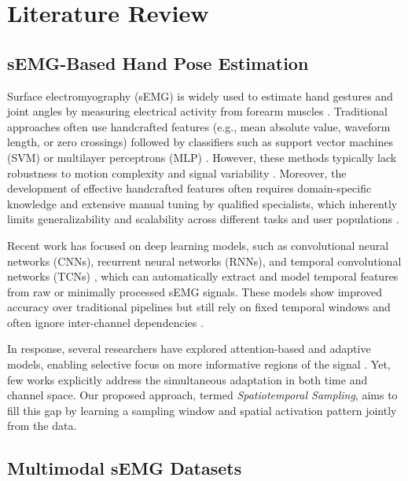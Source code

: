 \chapter{Literature Review}
\label{chap:lr}

\section{sEMG-Based Hand Pose Estimation}

Surface electromyography (sEMG) is widely used to estimate hand gestures and joint angles by measuring electrical activity from forearm muscles \cite{oskoei2007myoelectric, simao2019review}. Traditional approaches often use handcrafted features (e.g., mean absolute value, waveform length, or zero crossings) followed by classifiers such as support vector machines (SVM) or multilayer perceptrons (MLP) \cite{oladazimi2012review, liu2007recognition}. However, these methods typically lack robustness to motion complexity and signal variability \cite{parajuli2019real}. Moreover, the development of effective handcrafted features often requires domain-specific knowledge and extensive manual tuning by qualified specialists, which inherently limits generalizability and scalability across different tasks and user populations \cite{atzori2016deep, oskoei2008support, phinyomark2018feature}.

Recent work has focused on deep learning models, such as convolutional neural networks (CNNs), recurrent neural networks (RNNs), and temporal convolutional networks (TCNs) \cite{ameri2019regression, briouza2021convolutional, zhang2023lstm}, which can automatically extract and model temporal features from raw or minimally processed sEMG signals. These models show improved accuracy over traditional pipelines but still rely on fixed temporal windows and often ignore inter-channel dependencies \cite{lee2022explainable}.

In response, several researchers have explored attention-based and adaptive models, enabling selective focus on more informative regions of the signal \cite{yang2025stcnet, hu2019semg}. Yet, few works explicitly address the simultaneous adaptation in both time and channel space. Our proposed approach, termed \textit{Spatiotemporal Sampling}, aims to fill this gap by learning a sampling window and spatial activation pattern jointly from the data.

\section{Multimodal sEMG Datasets}

